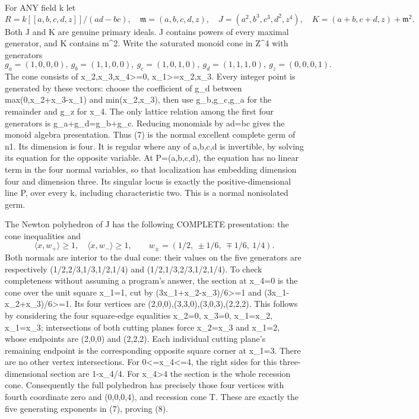 \documentclass[11pt]{article}
\begin{document}
For ANY field k let
\[
 R=k[[a,b,c,d,z]]/(ad-bc),\quad \mathfrak m=(a,b,c,d,z),\quad
 J=(a^2,b^3,c^3,d^2,z^4),\quad
 K=(a+b,c+d,z)+\mathfrak m^2.                               \tag{7}
\]
Both J and K are genuine primary ideals. J contains powers of every maximal generator, and K contains m\textasciicircum{}2. Write the saturated monoid cone in Z\textasciicircum{}4 with generators
\[
 g_a=(1,0,0,0),\ g_b=(1,1,0,0),\ g_c=(1,0,1,0),\
 g_d=(1,1,1,0),\ g_z=(0,0,0,1).
\]
The cone consists of x\_2,x\_3,x\_4>=0, x\_1>=x\_2,x\_3. Every integer point is generated by these vectors: choose the coefficient of g\_d between max(0,x\_2+x\_3-x\_1) and min(x\_2,x\_3), then use g\_b,g\_c,g\_a for the remainder and g\_z for x\_4. The only lattice relation among the first four generators is g\_a+g\_d=g\_b+g\_c. Reducing monomials by ad=bc gives the monoid algebra presentation. Thus (7) is the normal excellent complete germ of n1. Its dimension is four. It is regular where any of a,b,c,d is invertible, by solving its equation for the opposite variable. At P=(a,b,c,d), the equation has no linear term in the four normal variables, so that localization has embedding dimension four and dimension three. Its singular locus is exactly the positive-dimensional line P, over every k, including characteristic two. This is a normal nonisolated germ.

The Newton polyhedron of J has the following COMPLETE presentation: the cone inequalities and
\[
 \langle x,w_+\rangle\ge1,\quad \langle x,w_-\rangle\ge1,\qquad
 w_\pm=(1/2,\ \pm1/6,\ \mp1/6,\ 1/4).                  \tag{8}
\]
Both normals are interior to the dual cone: their values on the five generators are respectively (1/2,2/3,1/3,1/2,1/4) and (1/2,1/3,2/3,1/2,1/4). To check completeness without assuming a program's answer, the section at x\_4=0 is the cone over the unit square x\_1=1, cut by (3x\_1+x\_2-x\_3)/6>=1 and (3x\_1-x\_2+x\_3)/6>=1. Its four vertices are (2,0,0),(3,3,0),(3,0,3),(2,2,2). This follows by considering the four square-edge equalities x\_2=0, x\_3=0, x\_1=x\_2, x\_1=x\_3; intersections of both cutting planes force x\_2=x\_3 and x\_1=2, whose endpoints are (2,0,0) and (2,2,2). Each individual cutting plane's remaining endpoint is the corresponding opposite square corner at x\_1=3. There are no other vertex intersections. For 0<=x\_4<=4, the right sides for this three-dimensional section are 1-x\_4/4. For x\_4>4 the section is the whole recession cone. Consequently the full polyhedron has precisely those four vertices with fourth coordinate zero and (0,0,0,4), and recession cone T. These are exactly the five generating exponents in (7), proving (8).
\end{document}
